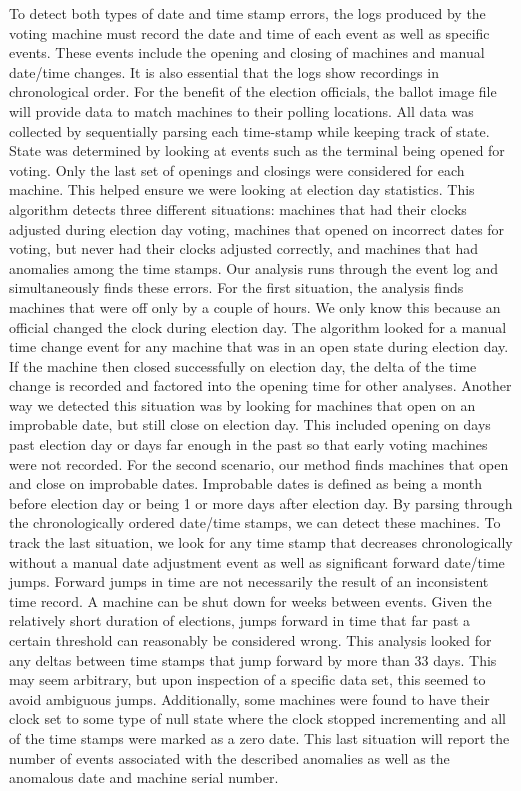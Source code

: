 To detect both types of date and time stamp errors, the logs produced by the voting machine must record the date and time of each event as well as specific events.  These events include the opening and closing of machines and manual date/time changes.  It is also essential that the logs show recordings in chronological order.  For the benefit of the election officials, the ballot image file will provide data to match machines to their polling locations.  All data was collected by sequentially parsing each time-stamp while keeping track of state. State was determined by looking at events such as the terminal being opened for voting. Only the last set of openings and closings were considered for each machine. This helped ensure we were looking at election day statistics.  This algorithm detects three different situations: machines that had their clocks adjusted during election day voting, machines that opened on incorrect dates for voting, but never had their clocks adjusted correctly, and machines that had anomalies among the time stamps.  Our analysis runs through the event log and simultaneously finds these errors.  For the first situation, the analysis finds machines that were off only by a couple of hours.  We only know this because an official changed the clock during election day.  The algorithm looked for a manual time change event for any machine that was in an open state during election day.  If the machine then closed successfully on election day, the delta of the time change is recorded and factored into the opening time for other analyses.  Another way we detected this situation was by looking for machines that open on an improbable date, but still close on election day.  This included opening on days past election day or days far enough in the past so that early voting machines were not recorded.  For the second scenario, our method finds machines that open and close on improbable dates.  Improbable dates is defined as being a month before election day or being 1 or more days after election day.  By parsing through the chronologically ordered date/time stamps, we can detect these machines.  To track the last situation, we look for any time stamp that decreases chronologically without a manual date adjustment event as well as significant forward date/time jumps.  Forward jumps in time are not necessarily the result of an inconsistent time record.  A machine can be shut down for weeks between events.  Given the relatively short duration of elections, jumps forward in time that far past a certain threshold can reasonably be considered wrong.  This analysis looked for any deltas between time stamps that jump forward by more than 33 days.  This may seem arbitrary, but upon inspection of a specific data set, this seemed to avoid ambiguous jumps.  Additionally, some machines were found to have their clock set to some type of null state where the clock stopped incrementing and all of the time stamps were marked as a zero date.  This last situation will report the number of events associated with the described anomalies as well as the anomalous date and machine serial number.      